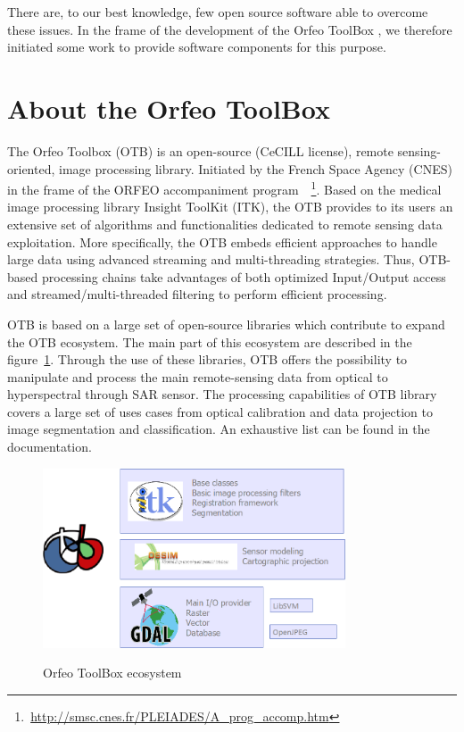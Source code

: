 \documentclass{josis}
\newcommand{\furl}[1]{    $\,$\footnote{$\,$\url{#1}}}
\begin{document}
There are, to our best knowledge, few open source software able to
overcome these issues. In the frame of the development of the Orfeo
ToolBox \cite{}, we therefore initiated some work to provide software
components for this purpose.

\section{About the Orfeo ToolBox}

The Orfeo Toolbox (OTB) is an open-source (CeCILL license), remote sensing-oriented, image processing library. Initiated by the French Space Agency (CNES) in the frame of the ORFEO accompaniment program~\furl{http://smsc.cnes.fr/PLEIADES/A_prog_accomp.htm}. Based on the medical image processing library Insight ToolKit (ITK), the OTB provides to its users an extensive set of algorithms and functionalities dedicated to remote sensing data exploitation. More specifically, the OTB embeds efficient approaches to handle large data using advanced streaming and multi-threading strategies. Thus, OTB-based processing chains take advantages of both optimized Input/Output access and streamed/multi-threaded filtering to perform efficient processing.

OTB is based on a large set of open-source libraries which contribute to expand the OTB ecosystem. The main part of this ecosystem are described in the figure~\ref{fig:ecosystem}. Through the use of these libraries, OTB offers the possibility to manipulate and process the main remote-sensing data from optical to hyperspectral through SAR sensor. The processing capabilities of OTB library covers a large set of uses cases from optical calibration and data projection to image segmentation and classification. An exhaustive list can be found in the documentation.

\begin{figure}[!htb]
\centering
\includegraphics[width=0.8\textwidth]{Pictures/otb_ecosystem}\label{fig:ecosystem}
\caption{Orfeo ToolBox ecosystem}
\end{figure}
\end{document}
